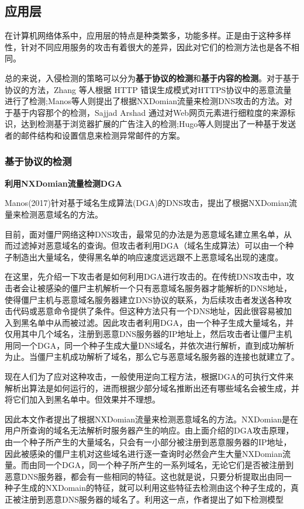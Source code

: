 \documentclass[12pt]{article} %
\begin{document}
\subsection{应用层}
\label{app}

在计算机网络体系中，应用层的特点是种类繁多，功能多样。正是由于这种多样性，针对不同应用服务的攻击有着很大的差异，因此对它们的检测方法也是各不相同。

总的来说，入侵检测的策略可以分为\textbf{基于协议的检测}和\textbf{基于内容的检测}。对于基于协议的方法，Zhang 等人根据 HTTP 错误生成模式对HTTPS协议中的恶意流量进行了检测;Manos等人则提出了根据NXDomian流量来检测DNS攻击的方法。对于基于内容那个的检测，Sajjad Arshad 通过对Web网页元素进行细粒度的来源标识，达到检测基于浏览器扩展的广告注入的检测;Hugo等人则提出了一种基于发送者的邮件结构和设置信息来检测异常邮件的方案。

\subsubsection{基于协议的检测}
\label{protocol}

\textbf{利用NXDomian流量检测DGA}


Manos(2017)\cite{Manos}针对基于域名生成算法(DGA)的DNS攻击，提出了根据NXDomian流量来检测恶意域名的方法。

目前，面对僵尸网络这种DNS攻击，最常见的办法是为恶意域名建立黑名单，从而过滤掉对恶意域名的查询。但攻击者利用DGA（域名生成算法）可以由一个种子制造出大量域名，使得黑名单的响应速度远远跟不上恶意域名出现的速度。

在这里，先介绍一下攻击者是如何利用DGA进行攻击的。在传统DNS攻击中，攻击者会让被感染的僵尸主机解析一个只有恶意域名服务器才能解析的DNS地址，使得僵尸主机与恶意域名服务器建立DNS协议的联系，为后续攻击者发送各种攻击代码或恶意命令提供了条件。但这种方法只有一个DNS地址，因此很容易被加入到黑名单中从而被过滤。因此攻击者利用DGA，由一个种子生成大量域名，并仅用其中几个域名，注册到恶意DNS服务器的IP地址上，然后攻击者让僵尸主机用同一个DGA，同一个种子生成大量DNS域名，并依次进行解析，直到成功解析为止。当僵尸主机成功解析了域名，那么它与恶意域名服务器的连接也就建立了。

现在人们为了应对这种攻击，一般使用逆向工程方法，根据DGA的可执行文件来解析出算法是如何运行的，进而根据少部分域名推断出还有哪些域名会被生成，并将它们加入到黑名单中。但效果并不理想。

因此本文作者提出了根据NXDomian流量来检测恶意域名的方法。NXDomian是在用户所查询的域名无法解析时服务器产生的响应。由上面介绍的DGA攻击原理，由一个种子所产生的大量域名，只会有一小部分被注册到恶意服务器的IP地址，因此被感染的僵尸主机对这些域名进行逐一查询时必然会产生大量NXDomian流量。而由同一个DGA，同一个种子所产生的一系列域名，无论它们是否被注册到恶意DNS服务器，都会有一些相同的特征。这也就是说，只要分析提取出由同一种子生成的NXDomain的特征，就可以利用这些特征去检测由这个种子生成的，真正被注册到恶意DNS服务器的域名了。利用这一点，作者提出了如下检测模型
\end{document}
